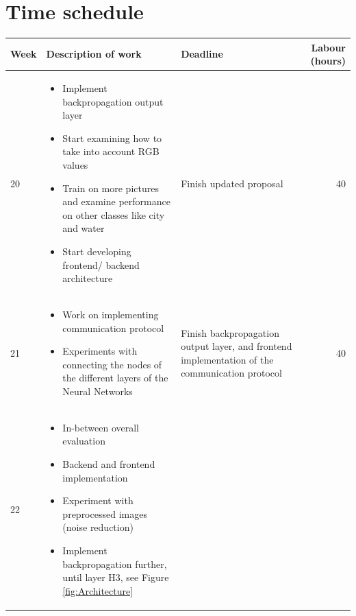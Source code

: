\documentclass[a4paper,onecolumn]{report}
\begin{document}
\chapter{Time schedule}
\begin{center}
  \begin{tabular}{| l | p{5cm}| p{5cm} | r | }
    \hline
    \textbf{Week} & \textbf{Description of work} & \textbf{Deadline} & \textbf{Labour (hours)} \\ \hline \hline
	20 & \begin{itemize} \vspace{-1.75em} \item Implement backpropagation output layer\vspace{-1em}
	\item Start examining how to take into account RGB values \vspace{-1em}
	\item Train on more pictures and examine performance on  other classes like city and water \vspace{-1em}
	\item Start developing frontend/ backend architecture
	\end{itemize}
	& Finish updated proposal & 40 					\\	\hline	
	21 &  \begin{itemize} \vspace{-1.75em} \item Work on implementing communication protocol\vspace{-1em}
	\item Experiments with connecting the nodes of the different layers of the Neural Networks \vspace{-1em}
	\end{itemize}
	& Finish backpropagation output layer, and frontend implementation of the communication protocol& 40 					\\	\hline
	22 & \begin{itemize} \vspace{-1.75em}
	\item In-between overall evaluation \vspace{-1em}
	\item Backend and frontend implementation\vspace{-1em}
	\item Experiment with preprocessed images (noise reduction) \vspace{-1em}
	\item Implement backpropagation further, until layer H3, see Figure \ref{fig:Architecture} \vspace{-1em}

\end{itemize}
\end{tabular}
\end{center}
\end{document}
